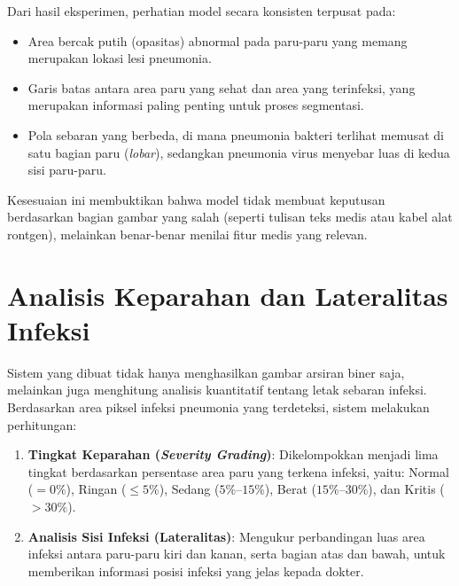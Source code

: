 \documentclass[12pt,a4paper,oneside]{book}
\begin{document}
Dari hasil eksperimen, perhatian model secara konsisten terpusat pada:
\begin{itemize}
  \item Area bercak putih (opasitas) abnormal pada paru-paru yang memang merupakan lokasi lesi pneumonia.
  \item Garis batas antara area paru yang sehat dan area yang terinfeksi, yang merupakan informasi paling penting untuk proses segmentasi.
  \item Pola sebaran yang berbeda, di mana pneumonia bakteri terlihat memusat di satu bagian paru (\textit{lobar}), sedangkan pneumonia virus menyebar luas di kedua sisi paru-paru.
\end{itemize}

Kesesuaian ini membuktikan bahwa model tidak membuat keputusan berdasarkan bagian gambar yang salah (seperti tulisan teks medis atau kabel alat rontgen), melainkan benar-benar menilai fitur medis yang relevan.

\section{Analisis Keparahan dan Lateralitas Infeksi}

Sistem yang dibuat tidak hanya menghasilkan gambar arsiran biner saja, melainkan juga menghitung analisis kuantitatif tentang letak sebaran infeksi. Berdasarkan area piksel infeksi pneumonia yang terdeteksi, sistem melakukan perhitungan:

\begin{enumerate}
  \item \textbf{Tingkat Keparahan (\textit{Severity Grading})}: Dikelompokkan menjadi lima tingkat berdasarkan persentase area paru yang terkena infeksi, yaitu: Normal ($= 0\%$), Ringan ($ \le 5\%$), Sedang ($5\%$--$15\%$), Berat ($15\%$--$30\%$), dan Kritis ($> 30\%$).
  \item \textbf{Analisis Sisi Infeksi (Lateralitas)}: Mengukur perbandingan luas area infeksi antara paru-paru kiri dan kanan, serta bagian atas dan bawah, untuk memberikan informasi posisi infeksi yang jelas kepada dokter.
\end{enumerate}
\end{document}
